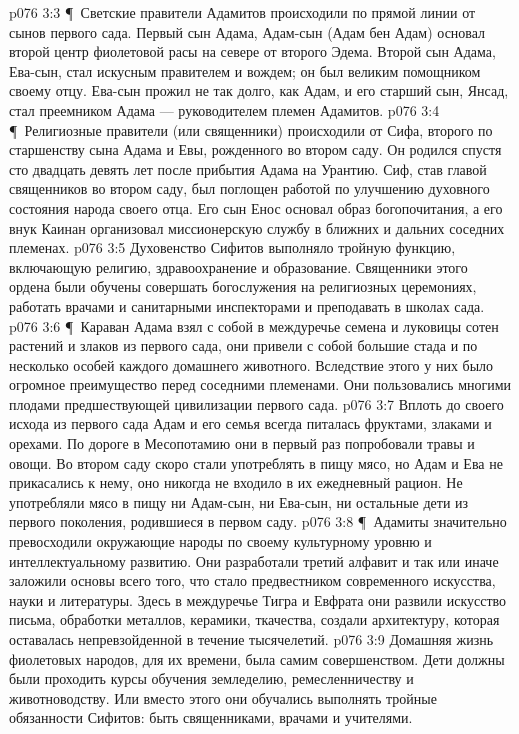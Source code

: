 \vs p076 3:3 \P\ Светские правители Адамитов происходили по прямой линии от сынов первого сада. Первый сын Адама, Адам\hyp{}сын (Адам бен Адам) основал второй центр фиолетовой расы на севере от второго Эдема. Второй сын Адама, Ева\hyp{}сын, стал искусным правителем и вождем; он был великим помощником своему отцу. Ева\hyp{}сын прожил не так долго, как Адам, и его старший сын, Янсад, стал преемником Адама --- руководителем племен Адамитов.
\vs p076 3:4 \P\ Религиозные правители (или священники) происходили от Сифа, второго по старшенству сына Адама и Евы, рожденного во втором саду. Он родился спустя сто двадцать девять лет после прибытия Адама на Урантию. Сиф, став главой священников во втором саду, был поглощен работой по улучшению духовного состояния народа своего отца. Его сын Енос основал образ богопочитания, а его внук Каинан организовал миссионерскую службу в ближних и дальних соседних племенах.
\vs p076 3:5 Духовенство Сифитов выполняло тройную функцию, включающую религию, здравоохранение и образование. Священники этого ордена были обучены совершать богослужения на религиозных церемониях, работать врачами и санитарными инспекторами и преподавать в школах сада.
\vs p076 3:6 \P\ Караван Адама взял с собой в междуречье семена и луковицы сотен растений и злаков из первого сада, они привели с собой большие стада и по несколько особей каждого домашнего животного. Вследствие этого у них было огромное преимущество перед соседними племенами. Они пользовались многими плодами предшествующей цивилизации первого сада.
\vs p076 3:7 Вплоть до своего исхода из первого сада Адам и его семья всегда питалась фруктами, злаками и орехами. По дороге в Месопотамию они в первый раз попробовали травы и овощи. Во втором саду скоро стали употреблять в пищу мясо, но Адам и Ева не прикасались к нему, оно никогда не входило в их ежедневный рацион. Не употребляли мясо в пищу ни Адам\hyp{}сын, ни Ева\hyp{}сын, ни остальные дети из первого поколения, родившиеся в первом саду.
\vs p076 3:8 \P\ Адамиты значительно превосходили окружающие народы по своему культурному уровню и интеллектуальному развитию. Они разработали третий алфавит и так или иначе заложили основы всего того, что стало предвестником современного искусства, науки и литературы. Здесь в междуречье Тигра и Евфрата они развили искусство письма, обработки металлов, керамики, ткачества, создали архитектуру, которая оставалась непревзойденной в течение тысячелетий.
\vs p076 3:9 Домашняя жизнь фиолетовых народов, для их времени, была самим совершенством. Дети должны были проходить курсы обучения земледелию, ремесленничеству и животноводству. Или вместо этого они обучались выполнять тройные обязанности Сифитов: быть священниками, врачами и учителями.
